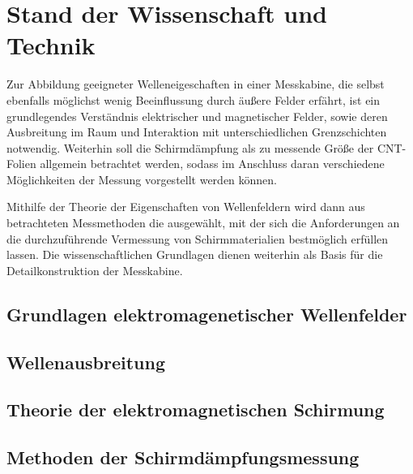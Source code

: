 

\chapter{Stand der Wissenschaft und Technik}\label{cha:2}

Zur Abbildung geeigneter Welleneigeschaften in einer Messkabine, die selbst ebenfalls möglichst wenig Beeinflussung durch äußere Felder erfährt, ist ein grundlegendes Verständnis elektrischer und magnetischer Felder, sowie deren Ausbreitung im Raum und Interaktion mit unterschiedlichen Grenzschichten notwendig. Weiterhin soll die Schirmdämpfung als zu messende Größe der CNT-Folien allgemein betrachtet werden, sodass im Anschluss daran verschiedene Möglichkeiten der Messung vorgestellt werden können. \par
\vspace{\linespace}
Mithilfe der Theorie der Eigenschaften von Wellenfeldern wird dann aus betrachteten Messmethoden die ausgewählt, mit der sich die Anforderungen an die durchzuführende Vermessung von Schirmmaterialien bestmöglich erfüllen lassen. Die wissenschaftlichen Grundlagen dienen weiterhin als Basis für die Detailkonstruktion der Messkabine.


\section{Grundlagen elektromagenetischer Wellenfelder}\label{cha:2_Grundlagen}




\section{Wellenausbreitung}\label{cha:2_Wellenausbreitung}




\section{Theorie der elektromagnetischen Schirmung}\label{cha:2_Theorie_der_elektromagnetischen_Schirmung}





\section{Methoden der Schirmdämpfungsmessung}\label{cha:2_Methoden_der_Schirmdaempfungsmessung}

